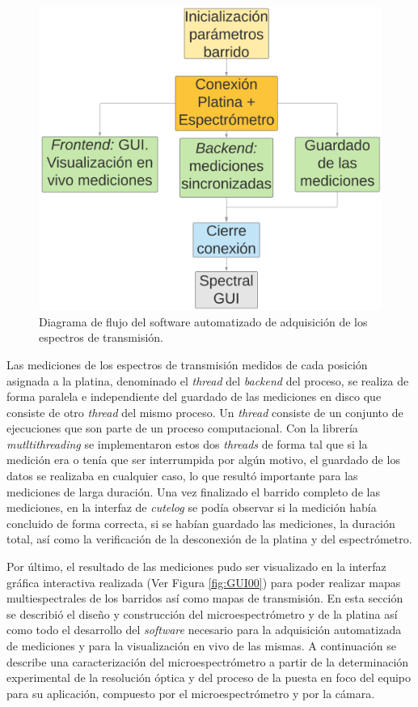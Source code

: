  \begin{figure}[H]
	\centering
	\includegraphics[width=1.0\textwidth]{Figs/microespectrometro/flowdiagprot0.png}
	\caption{Diagrama de flujo del software automatizado de adquisición de los espectros de transmisión.}
	\label{fig:ddinaaa}
\end{figure}



Las mediciones de los espectros de transmisión medidos de cada posición asignada a la platina, denominado el \textit{thread} del \textit{backend} del proceso, se realiza de forma paralela e independiente del guardado de las mediciones en disco que consiste de otro \textit{thread} del mismo proceso. Un \textit{thread} consiste de un conjunto de ejecuciones que son parte de un proceso computacional. Con la librería \textit{mutltithreading} se implementaron estos dos \textit{threads} de forma tal que si la medición era o tenía que ser interrumpida por algún motivo, el guardado de los datos se realizaba en cualquier caso, lo que resultó importante para las mediciones de larga duración. Una vez finalizado el barrido completo de las mediciones, en la interfaz de \textit{cutelog} se podía observar si la medición había concluido de forma correcta, si se habían guardado las mediciones, la duración total, así como la verificación de la desconexión de la platina y del espectrómetro.

Por último, el resultado de las mediciones pudo ser visualizado en la interfaz gráfica interactiva realizada (Ver Figura \ref{fig:GUI00}) para poder realizar mapas multiespectrales de los barridos así como mapas de transmisión.
En esta sección se describió el diseño y construcción del microespectrómetro y de la platina así como todo el desarrollo del \textit{software} necesario para la adquisición automatizada de mediciones y para la visualización en vivo de las mismas. A continuación se describe una caracterización del microespectrómetro a partir de la determinación experimental de la resolución óptica y del proceso de la puesta en foco del equipo para su aplicación, compuesto por el microespectrómetro y por la cámara. 
 

